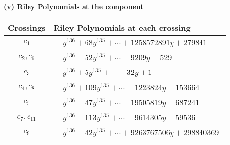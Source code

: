 \documentclass[1p]{elsarticle_modified}
\theoremstyle{definition}
\begin{document}
\newpage\renewcommand{\arraystretch}{1}
\flushleft \textbf{(v) Riley Polynomials at the component}\newline \\
\begin{tabular}{m{50pt}|m{274pt}}
Crossings & \hspace{64pt}Riley Polynomials at each crossing \\
\hline $$\begin{aligned}c_{1}\end{aligned}$$&$\begin{aligned}
&y^{136}+68 y^{135}+\cdots+1258572891 y+279841
\end{aligned}$\\
\hline $$\begin{aligned}c_{2},c_{6}\end{aligned}$$&$\begin{aligned}
&y^{136}-52 y^{135}+\cdots-9209 y+529
\end{aligned}$\\
\hline $$\begin{aligned}c_{3}\end{aligned}$$&$\begin{aligned}
&y^{136}+5 y^{135}+\cdots-32 y+1
\end{aligned}$\\
\hline $$\begin{aligned}c_{4},c_{8}\end{aligned}$$&$\begin{aligned}
&y^{136}+109 y^{135}+\cdots-1223824 y+153664
\end{aligned}$\\
\hline $$\begin{aligned}c_{5}\end{aligned}$$&$\begin{aligned}
&y^{136}-47 y^{135}+\cdots-19505819 y+687241
\end{aligned}$\\
\hline $$\begin{aligned}c_{7},c_{11}\end{aligned}$$&$\begin{aligned}
&y^{136}-113 y^{135}+\cdots-9614305 y+59536
\end{aligned}$\\
\hline $$\begin{aligned}c_{9}\end{aligned}$$&$\begin{aligned}
&y^{136}-42 y^{135}+\cdots+9263767506 y+298840369
\end{aligned}$\\

\end{tabular}
\end{document}
